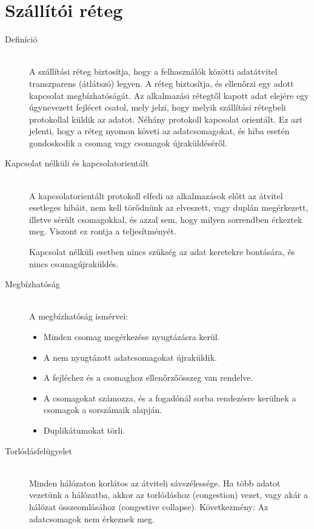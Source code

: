 \documentclass[margin=0px]{article}
\begin{document}
\section{Szállítói réteg}
\begin{description}
    \item[Definíció] \hfill \\
        A szállítási réteg biztosítja, hogy a felhasználók közötti adatátvitel transzparens (átlátszó) legyen. A réteg biztosítja, és ellenőrzi egy adott kapcsolat megbízhatóságát. Az alkalmazási rétegtől kapott adat elejére egy úgynevezett fejlécet csatol, mely jelzi, hogy melyik szállítási rétegbeli protokollal küldik az adatot. Néhány protokoll kapcsolat orientált. Ez azt jelenti, hogy a réteg nyomon követi az adatcsomagokat, és hiba esetén gondoskodik a csomag vagy csomagok újraküldéséről.

    \item[Kapcsolat nélküli és kapcsolatorientált] \hfill \\
        A kapcsolatorientált protokoll elfedi az alkalmazások előtt az átvitel esetleges hibáit, nem kell törődnünk az elveszett, vagy duplán megérkezett, illetve sérült csomagokkal, és azzal sem, hogy milyen sorrendben érkeztek meg. Viszont ez rontja a teljesítményét.

        Kapcsolat nélküli esetben nincs szükség az adat keretekre bontására, és nincs  csomagújraküldés.
    \item[Megbízhatóság] \hfill \\
        A megbízhatóság ismérvei:
        \begin{itemize}
            \item Minden csomag megérkezése nyugtázásra kerül.
            \item A nem nyugtázott adatcsomagokat újraküldik.
            \item A fejléchez és a csomaghoz ellenőrzőösszeg van rendelve.
            \item A csomagokat számozza, és a fogadónál sorba rendezésre kerülnek a csomagok a sorszámaik alapján.
            \item Duplikátumokat törli.
        \end{itemize}
    \item[Torlódásfelügyelet] \hfill \\
        Minden hálózaton  korlátos az átviteli sávszélessége. Ha több adatot vezetünk a hálózatba, akkor az torlódáshoz (congestion) vezet, vagy akár a hálózat összeomlásához (congestive collapse). Következmény: Az adatcsomagok nem érkeznek meg.


\end{description}
\end{document}
